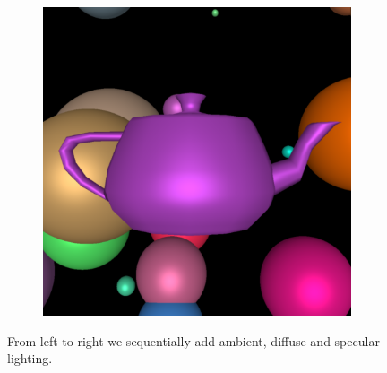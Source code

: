 \documentclass[a4paper,11pt]{article}%
\begin{document}
\begin{figure}[h]
\begin{subfigure}{.3\textwidth}
\end{subfigure} %
\begin{subfigure}{.3\textwidth}
  \centering
  \includegraphics[width=.9\linewidth]{img/specularteapot.png}
\end{subfigure}    
    
    \caption{From left to right we sequentially add ambient, diffuse and specular lighting.}
    \label{fig:lightteapot}
\end{figure}
\end{document}
